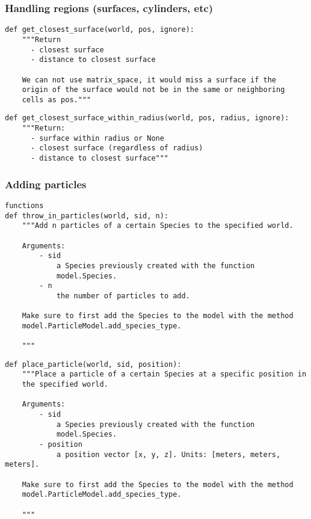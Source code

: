 \documentclass[a4paper,10pt]{article}
\begin{document}
\subsubsection{Handling regions (surfaces, cylinders, etc)}

\begin{verbatim}
def get_closest_surface(world, pos, ignore):
    """Return
      - closest surface
      - distance to closest surface
    
    We can not use matrix_space, it would miss a surface if the 
    origin of the surface would not be in the same or neighboring 
    cells as pos."""
\end{verbatim}

\begin{verbatim}
def get_closest_surface_within_radius(world, pos, radius, ignore):
    """Return:
      - surface within radius or None
      - closest surface (regardless of radius)
      - distance to closest surface"""
\end{verbatim}

\subsubsection{Adding particles}
\begin{verbatim}
functions
def throw_in_particles(world, sid, n):
    """Add n particles of a certain Species to the specified world.

    Arguments:
        - sid
            a Species previously created with the function 
            model.Species.
        - n
            the number of particles to add.

    Make sure to first add the Species to the model with the method
    model.ParticleModel.add_species_type.

    """
\end{verbatim}

\begin{verbatim}
def place_particle(world, sid, position):
    """Place a particle of a certain Species at a specific position in 
    the specified world.

    Arguments:
        - sid
            a Species previously created with the function 
            model.Species.
        - position
            a position vector [x, y, z]. Units: [meters, meters, meters].

    Make sure to first add the Species to the model with the method 
    model.ParticleModel.add_species_type.

    """
\end{verbatim}
\end{document}
